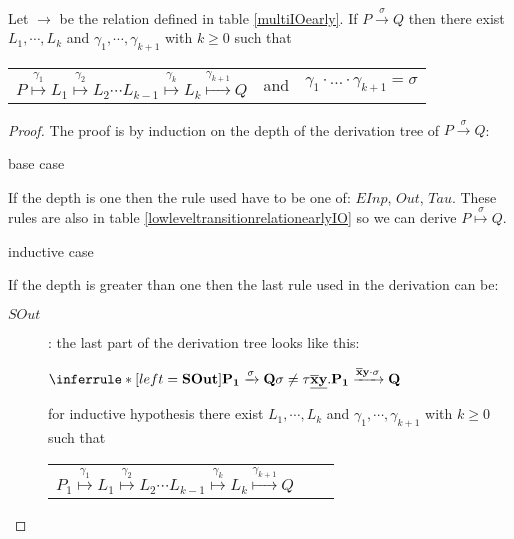 \begin{proposition}\label{multipiIOloweqright}
  Let $\rightarrow$ be the relation defined in table \ref{multiIOearly}. If $P\xrightarrow{\sigma} Q$ then there exist $L_{1}, \cdots, L_{k}$ and $\gamma_{1}, \cdots, \gamma_{k+1}$ with $k\geq 0$ such that 
  \begin{center}
    \begin{tabular}{lll}
      $P \stackrel{\gamma_{1}}{\longmapsto} L_{1} \stackrel{\gamma_{2}}{\longmapsto} L_{2} \cdots L_{k-1} \stackrel{\gamma_{k}}{\longmapsto} L_{k} \stackrel{\gamma_{k+1}}{\longmapsto} Q$ 
    &
      and
    &
      $\gamma_{1} \cdot \ldots \cdot \gamma_{k+1} = \sigma$  
    \end{tabular}
  \end{center}
  \begin{proof}
    The proof is by induction on the depth of the derivation tree of $P\xrightarrow{\sigma} Q$:
    \begin{description}
      \item[base case]
    \end{description}
	If the depth is one then the rule used have to be one of: $EInp$, $Out$, $Tau$. These rules are also in table \ref{lowleveltransitionrelationearlyIO} so we can derive $P \stackrel{\sigma}{\longmapsto}Q$.
    \begin{description}
      \item[inductive case]
    \end{description}
	If the depth is greater than one then the last rule used in the derivation can be:
	\begin{description}
	  \item[$SOut$]: 
	    the last part of the derivation tree looks like this:
	    \begin{center}
	      $\inferrule* [left=\bf{SOut}]{
		  P_{1} \xrightarrow{\sigma} Q
		\\
		  \sigma \neq \tau
	      }{
		\underline{\overline{x}y}.P_{1} \xrightarrow{\overline{x}y \cdot \sigma} Q
	      }$	      
	    \end{center}
	    for inductive hypothesis there exist $L_{1}, \cdots, L_{k}$ and $\gamma_{1}, \cdots, \gamma_{k+1}$ with $k\geq 0$ such that 
	    \begin{center}
	      \begin{tabular}{lll}
		$P_{1} \stackrel{\gamma_{1}}{\longmapsto} L_{1} \stackrel{\gamma_{2}}{\longmapsto} L_{2} \cdots L_{k-1} \stackrel{\gamma_{k}}{\longmapsto} L_{k} \stackrel{\gamma_{k+1}}{\longmapsto} Q$ 

\end{tabular}
\end{center}
\end{description}
\end{proof}
\end{proposition}
